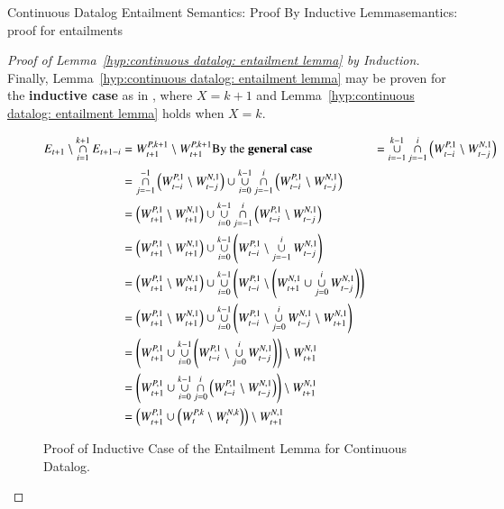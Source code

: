 \begin{nestedsection}{Continuous Datalog Entailment Semantics: Proof By Inductive Lemma}{semantics: proof for entailments}
\begin{proof}[Proof of Lemma~\ref{hyp:continuous datalog: entailment lemma} by Induction]
		Finally, Lemma~\ref{hyp:continuous datalog: entailment lemma} may be proven for the \textbf{inductive case} as in , where ${X = k + 1}$ and Lemma~\ref{hyp:continuous datalog: entailment lemma} holds when ${X = k}$.
		\begin{figure}[p]
			\centering
			\caption[Proof of Entailment Lemma for Continuous Datalog]{Proof of Inductive Case of the Entailment Lemma for Continuous Datalog.}
			\begin{align*}
				E_{t+1} \setminus \mathop{\cap}^{k+1}_{i=1} E_{t+1-i} & = W^{P,k+1}_{t+1} \setminus W^{P,k+1}_{t+1}
				\text{By the \textbf{general case}} & = \mathop{\cup}^{k-1}_{i=-1}\mathop{\cap}^{i}_{j=-1} \left( W^{P,1}_{t-i} \setminus W^{N,1}_{t-j} \right) \\
				& = \mathop{\cap}^{-1}_{j=-1} \left( W^{P,1}_{t-i} \setminus W^{N,1}_{t-j} \right) \cup \mathop{\cup}^{k-1}_{i=0}\mathop{\cap}^{i}_{j=-1} \left( W^{P,1}_{t-i} \setminus W^{N,1}_{t-j} \right) \\
				& = \left( W^{P,1}_{t+1} \setminus W^{N,1}_{t+1} \right) \cup \mathop{\cup}^{k-1}_{i=0}\mathop{\cap}^{i}_{j=-1} \left( W^{P,1}_{t-i} \setminus W^{N,1}_{t-j} \right) \\
				& = \left( W^{P,1}_{t+1} \setminus W^{N,1}_{t+1} \right) \cup \mathop{\cup}^{k-1}_{i=0} \left( W^{P,1}_{t-i} \setminus \mathop{\cup}^{i}_{j=-1} W^{N,1}_{t-j} \right) \\
				& = \left( W^{P,1}_{t+1} \setminus W^{N,1}_{t+1} \right) \cup \mathop{\cup}^{k-1}_{i=0} \left( W^{P,1}_{t-i} \setminus \left( W^{N,1}_{t+1} \cup \mathop{\cup}^{i}_{j=0} W^{N,1}_{t-j} \right) \right) \\
				& = \left( W^{P,1}_{t+1} \setminus W^{N,1}_{t+1} \right) \cup \mathop{\cup}^{k-1}_{i=0} \left( W^{P,1}_{t-i} \setminus \mathop{\cup}^{i}_{j=0} W^{N,1}_{t-j} \setminus W^{N,1}_{t+1} \right) \\
				& = \left( W^{P,1}_{t+1} \cup \mathop{\cup}^{k-1}_{i=0} \left( W^{P,1}_{t-i} \setminus \mathop{\cup}^{i}_{j=0} W^{N,1}_{t-j} \right) \right) \setminus W^{N,1}_{t+1} \\
				& = \left( W^{P,1}_{t+1} \cup \mathop{\cup}^{k-1}_{i=0}\mathop{\cap}^{i}_{j=0} \left( W^{P,1}_{t-i} \setminus W^{N,1}_{t-j} \right) \right) \setminus W^{N,1}_{t+1} \\
				& = \left( W^{P,1}_{t+1} \cup \left( W^{P,k}_{t} \setminus W^{N,k}_{t} \right) \right) \setminus W^{N,1}_{t+1} \\

\end{align*}
\end{figure}
\end{proof}
\end{nestedsection}
